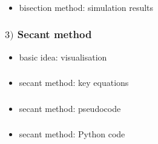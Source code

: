 \documentclass[english,14pt]{beamer}
\begin{document}

\begin{frame}[fragile]

\frametitle{}

\begin{itemize}
	\item bisection method: simulation results
\end{itemize}

\end{frame}


\begin{frame}[fragile]

\frametitle{$3)$ Secant method}

\begin{itemize}
	\item basic idea: visualisation
\end{itemize}

\end{frame}


\begin{frame}[fragile]

\frametitle{}

\begin{itemize}
	\item secant method: key equations
\end{itemize}

\end{frame}


\begin{frame}[fragile]

\frametitle{}

\begin{itemize}
	\item secant method: pseudocode
\end{itemize}

\end{frame}


\begin{frame}[fragile]

\frametitle{}

\begin{itemize}
	\item secant method: Python code
\end{itemize}

\end{frame}
\end{document}
